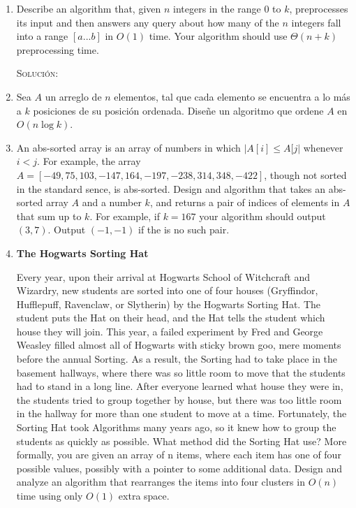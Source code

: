 \documentclass[letterpaper,11pt]{article}
\begin{document}
\begin{enumerate}
    \item Describe an algorithm that, given $n$ integers in the range $0$ to 
    $k$, preprocesses its input and then answers any query about how many of 
    the $n$ integers fall into a range $[a ... b]$ in $O(1)$ time. Your 
    algorithm should use $\Theta(n + k)$ preprocessing time.

    \textsc{Solución:}

    \item Sea $A$ un arreglo de $n$ elementos, tal que cada elemento se 
    encuentra a lo más a $k$ posiciones de su posición ordenada. Diseñe un 
    algoritmo que ordene $A$ en $O(n \log k)$.

    \item An abs-sorted array is an array of numbers in which $|A[i] \leq A[j|$
    whenever $i < j$. For example, the array $A = [-49, 75, 103, -147, 164, -197,
    -238, 314, 348, -422]$, though not sorted in the standard sence, is 
    abs-sorted. Design and algorithm that takes an abs-sorted array $A$ and a 
    number $k$, and returns a pair of indices of elements in $A$ that sum up to 
    $k$. For example, if $k = 167$ your algorithm should output $(3, 7)$. Output 
    $(-1, -1)$ if the is no such pair.

    \item \textbf{The Hogwarts Sorting Hat}

    Every year, upon their arrival at Hogwarts School of Witchcraft and Wizardry, 
    new students are sorted into one of four houses (Gryffindor, Hufflepuff, 
    Ravenclaw, or Slytherin) by the Hogwarts Sorting Hat. The student puts the 
    Hat on their head, and the Hat tells the student which house they will join. 
    This year, a failed experiment by Fred and George Weasley filled almost all 
    of Hogwarts with sticky brown goo, mere moments before the annual Sorting. 
    As a result, the Sorting had to take place in the basement hallways, where 
    there was so little room to move that the students had to stand in a long 
    line. After everyone learned what house they were in, the students tried to 
    group together by house, but there was too little room in the hallway for 
    more than one student to move at a time. Fortunately, the Sorting Hat took 
    Algorithms many years ago, so it knew how to group the students as quickly 
    as possible. What method did the Sorting Hat use? More formally, you are 
    given an array of n items, where each item has one of four possible values, 
    possibly with a pointer to some additional data. Design and analyze an 
    algorithm that rearranges the items into four clusters in $O(n)$ time 
    using only $O(1)$ extra space.


\end{enumerate}
\end{document}
